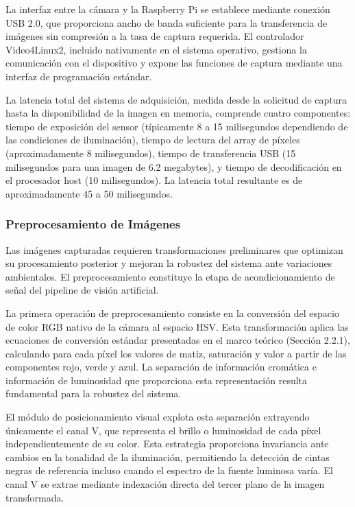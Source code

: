 La interfaz entre la cámara y la Raspberry Pi se establece mediante conexión USB 2.0, que proporciona ancho de banda suficiente para la transferencia de imágenes sin compresión a la tasa de captura requerida. El controlador Video4Linux2, incluido nativamente en el sistema operativo, gestiona la comunicación con el dispositivo y expone las funciones de captura mediante una interfaz de programación estándar.

La latencia total del sistema de adquisición, medida desde la solicitud de captura hasta la disponibilidad de la imagen en memoria, comprende cuatro componentes: tiempo de exposición del sensor (típicamente 8 a 15 milisegundos dependiendo de las condiciones de iluminación), tiempo de lectura del array de píxeles (aproximadamente 8 milisegundos), tiempo de transferencia USB (15 milisegundos para una imagen de 6.2 megabytes), y tiempo de decodificación en el procesador host (10 milisegundos). La latencia total resultante es de aproximadamente 45 a 50 milisegundos.

\subsubsection{Preprocesamiento de Imágenes}

Las imágenes capturadas requieren transformaciones preliminares que optimizan su procesamiento posterior y mejoran la robustez del sistema ante variaciones ambientales. El preprocesamiento constituye la etapa de acondicionamiento de señal del pipeline de visión artificial.

La primera operación de preprocesamiento consiste en la conversión del espacio de color RGB nativo de la cámara al espacio HSV. Esta transformación aplica las ecuaciones de conversión estándar presentadas en el marco teórico (Sección 2.2.1), calculando para cada píxel los valores de matiz, saturación y valor a partir de las componentes rojo, verde y azul. La separación de información cromática e información de luminosidad que proporciona esta representación resulta fundamental para la robustez del sistema.

El módulo de posicionamiento visual explota esta separación extrayendo únicamente el canal V, que representa el brillo o luminosidad de cada píxel independientemente de su color. Esta estrategia proporciona invariancia ante cambios en la tonalidad de la iluminación, permitiendo la detección de cintas negras de referencia incluso cuando el espectro de la fuente luminosa varía. El canal V se extrae mediante indexación directa del tercer plano de la imagen transformada.


